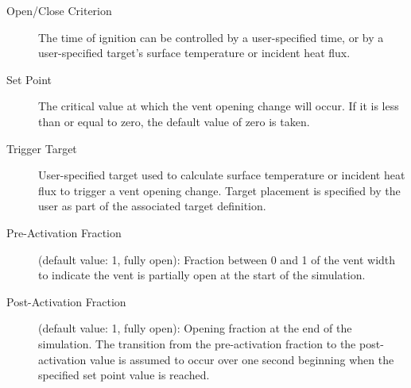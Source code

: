 \begin{description}
\item[Open/Close Criterion] The time of ignition can be controlled by a user-specified time, or by a user-specified target's surface temperature or incident heat flux.
\item[Set Point] The critical value at which the vent opening change will occur. If it is less than or equal to zero, the default value of zero is taken.
\item[Trigger Target] User-specified target used to calculate surface temperature or incident heat flux to trigger a vent opening change. Target placement is specified by the user as part of the associated target definition.
\item[Pre-Activation Fraction] (default value: 1, fully open): Fraction between 0 and 1 of the vent width to indicate the vent is partially open at the start of the simulation.
\item[Post-Activation Fraction] (default value: 1, fully open): Opening fraction at the end of the simulation. The transition from the pre-activation fraction to the post-activation value is assumed to occur over one second beginning when the specified set point value is reached.
\end{description}






